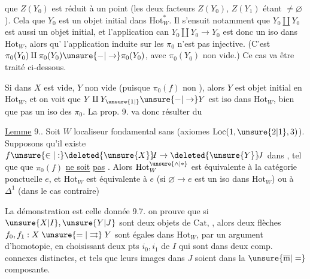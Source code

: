 
que $Z(Y_0)$ est réduit à un point (les deux
facteurs $Z(Y_0)$, $Z(Y_1)$ étant $\ne\varnothing$). Cela
  que $Y_0$ est un objet initial
dans $\mathrm{Hot}_{W}^{*}$. Il s'ensuit notamment
que $Y_0\amalg Y_0$ est aussi un objet initial,
et l'application can $Y_0\amalg Y_0\longrightarrow Y_0$ est donc
un iso dans $\mathrm{Hot}_{W}$, alors qu'
l'application induite sur les $\pi_0$ n'est pas
injective. (C'est $\pi_0(Y_0)\amalg\pi_0(Y_0)\unsure{-|\to}\pi_0(Y_0)$,
avec $\pi_0(Y_0)$ non vide.) Ce cas va être
traité ci-dessous.

Si dans  $X$ est vide, 
$Y$ non vide (puisque $\pi_0(f)$ non ),
alors $Y$ est objet initial en $\mathrm{Hot}_{W}$,
 et on voit  que $Y\amalg Y_{\unsure{1|{}}}\unsure{-|\to}Y$
est iso dans $\mathrm{Hot}_{W}$, bien que 
pas un iso  des $\pi_0$. La prop. 9.
va donc résulter du

\uline{Lemme} 9.. Soit $W$ localiseur fondamental sans  (axiomes $\mathrm{Loc}(1,\unsure{2|1},3)$).
Supposons qu'il existe $f\unsure{\in|:}\deleted{\unsure{X}}\!I\to\deleted{\unsure{Y}}\!J$ dans
, tel que 
que $\pi_0(f)$ \uline{ne soit}
\uline{pas}  .  Alors $\mathrm{Hot}_{W}^{\unsure{\wedge|*}}$
est équivalente à la catégorie ponctuelle \uline{$e$}, et
$\mathrm{Hot}_{W}$ est équivalente à $e$ (si $\varnothing\to e$ est un
iso dans $\mathrm{Hot}_{W}$) ou à $\Delta^1$ (dans le cas contraire)

La démonstration est celle donnée  9.7.
on prouve que si $\unsure{X|I},\unsure{Y|J}$ sont deux objets
de $\mathrm{Cat}$, , alors deux flèches
$f_0,f_1:X\mathrel{\unsure{=|\rightrightarrows}}Y$ sont égales dans $\mathrm{Hot}_{W}$,
par un argument d'homotopie, en
choisissant deux pts $i_0,i_1$ de $I$ qui
sont dans deux comp. connexes distinctes,
et tels que leurs images  dans $J$
soient dans la $\unsure{\overline{\mathrm m}|=}$ composante.

